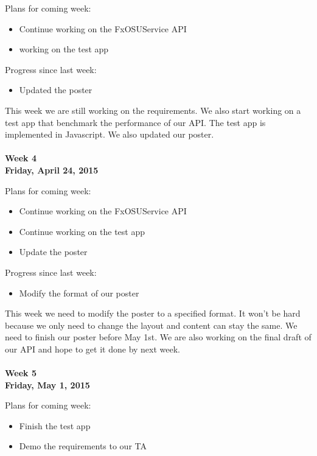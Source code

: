 \noindent Plans for coming week:
\begin{itemize}
\item Continue working on the FxOSUService API
\item working on the test app
\end{itemize}

\noindent Progress since last week:
\begin{itemize}
\item Updated the poster
\end{itemize}

\noindent This week we are still working on the requirements. We also start working on a test app that benchmark the performance of our API. The test app is implemented in Javascript. We also updated our poster. \\
\\
\textbf{Week 4\\Friday, April 24, 2015\\}

\noindent Plans for coming week:
\begin{itemize}
\item Continue working on the FxOSUService API
\item Continue working on the test app
\item Update the poster
\end{itemize}

\noindent Progress since last week:
\begin{itemize}
\item Modify the format of our poster
\end{itemize}

\noindent This week we need to modify the poster to a specified format. It won't be hard because we only need to change the layout and content can stay the same. We need to finish our poster before May 1st. We are also working on the final draft of our API and hope to get it done by next week. \\
\\
\textbf{Week 5\\Friday, May 1, 2015\\}

\noindent Plans for coming week:
\begin{itemize}
\item Finish the test app
\item Demo the requirements to our TA
\end{itemize}

